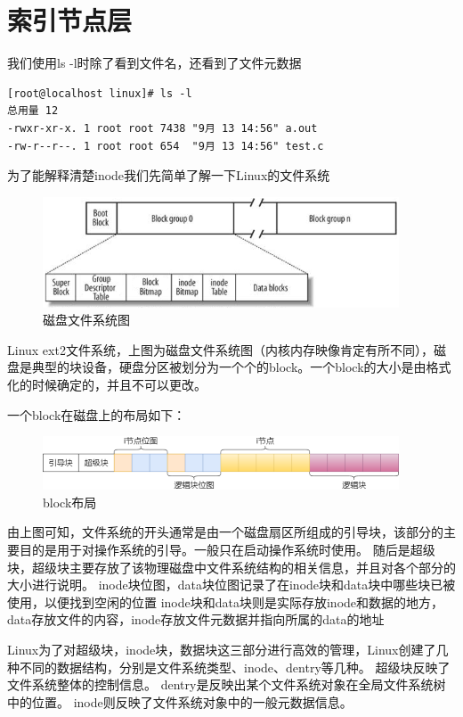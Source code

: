 \section{索引节点层}

我们使用ls -l时除了看到文件名，还看到了文件元数据
\begin{lstlisting}[]
[root@localhost linux]# ls -l
总用量 12
-rwxr-xr-x. 1 root root 7438 "9月 13 14:56" a.out
-rw-r--r--. 1 root root 654  "9月 13 14:56" test.c
\end{lstlisting}

为了能解释清楚inode我们先简单了解一下Linux的文件系统
\begin{figure}[H]
    \centering
    \includegraphics{figures/07-04-磁盘.png}
    \caption{磁盘文件系统图}
\end{figure}

Linux ext2文件系统，上图为磁盘文件系统图（内核内存映像肯定有所不同），磁盘是典型的块设备，硬盘分区被划分为一个个的block。一个block的大小是由格式化的时候确定的，并且不可以更改。

一个block在磁盘上的布局如下：
\begin{figure}[H]
    \centering
    \includegraphics{figures/07-04-inode.png}
    \caption{block布局}
\end{figure}
由上图可知，文件系统的开头通常是由一个磁盘扇区所组成的引导块，该部分的主要目的是用于对操作系统的引导。一般只在启动操作系统时使用。
随后是超级块，超级块主要存放了该物理磁盘中文件系统结构的相关信息，并且对各个部分的大小进行说明。
inode块位图，data块位图记录了在inode块和data块中哪些块已被使用，以便找到空闲的位置
inode块和data块则是实际存放inode和数据的地方，data存放文件的内容，inode存放文件元数据并指向所属的data的地址

Linux为了对超级块，inode块，数据块这三部分进行高效的管理，Linux创建了几种不同的数据结构，分别是文件系统类型、inode、dentry等几种。
超级块反映了文件系统整体的控制信息。
dentry是反映出某个文件系统对象在全局文件系统树中的位置。
inode则反映了文件系统对象中的一般元数据信息。

